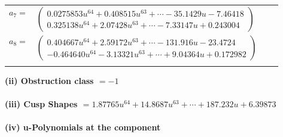 \documentclass[1p]{elsarticle_modified}
\theoremstyle{definition}
\begin{document}
\begin{tabular}{m{7pt} m{180pt} m{7pt} m{180pt} }
\flushright $a_{7}=$&$\begin{pmatrix}0.0275853 u^{64}+0.408515 u^{63}+\cdots-35.1429 u-7.46418\\0.325138 u^{64}+2.07428 u^{63}+\cdots-7.33147 u+0.243004\end{pmatrix}$ \\
\flushright $a_{8}=$&$\begin{pmatrix}0.404667 u^{64}+2.59172 u^{63}+\cdots-131.916 u-23.4724\\-0.464640 u^{64}-3.13321 u^{63}+\cdots+9.04364 u+0.172982\end{pmatrix}$\\&\end{tabular}
\flushleft \textbf{(ii) Obstruction class $= -1$}\\~\\
\flushleft \textbf{(iii) Cusp Shapes $= 1.87765 u^{64}+14.8687 u^{63}+\cdots+187.232 u+6.39873$}\\~\\
\newpage\renewcommand{\arraystretch}{1}
\flushleft \textbf{(iv) u-Polynomials at the component}\newline \\
\end{document}
